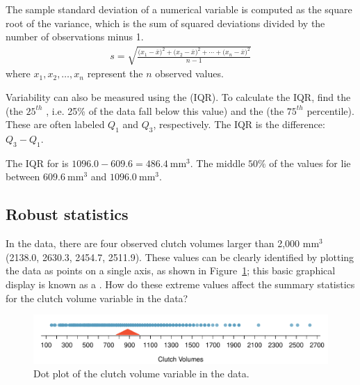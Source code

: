 \begin{doublespace}
\begin{termBox}{
		The sample standard deviation of a numerical variable is computed as the square root of the variance, which is the sum of squared deviations divided by the number of observations minus 1.
		\begin{eqnarray}
		s = \sqrt{\frac{({x_1 - \overline{x})}^{2}+({x_2 - \overline{x})}^{2}+\cdots+({x_n - \overline{x})}^{2}}{n-1}}
		\label{SDEquation}
		\end{eqnarray}
		where $x_1, x_2, \dots, x_n$ represent the $n$ observed values.}
\end{termBox}

Variability can also be measured using the  (IQR).  To calculate the IQR, find the   (the $25^{th}$ , i.e. 25\% of the data fall below this value) and the   (the $75^{th}$ percentile). These are often labeled $Q_1$ and $Q_3$, respectively. The IQR is the difference: $Q_3 - Q_1$.

The IQR for  is $1096.0 - 609.6 = 486.4\ \textrm{mm}^{3}$.  The middle $50\%$ of the values for  lie between $609.6\ \textrm{mm}^{3}$ and $1096.0\ \textrm{mm}^{3}$.

\subsection{Robust statistics}

In the  data, there are four observed clutch volumes larger than 2,000 $\textrm{mm}^{3}$ (2138.0, 2630.3, 2454.7, 2511.9). These values can be clearly identified by plotting the data as points on a single axis, as shown in Figure~\ref{frogClutchVolDotPlot}; this basic graphical display is known as a . How do these extreme values affect the summary statistics for the clutch volume variable in the  data?

\begin{figure}[ht]
	\centering
	\includegraphics[width=\textwidth]{ch_intro_to_data_oi_biostat/figures/frogClutchVolDotPlot/frogClutchVolDotPlot}
	\caption{Dot plot of the clutch volume variable in the  data.}
	\label{frogClutchVolDotPlot}
\end{figure}


\end{doublespace}
